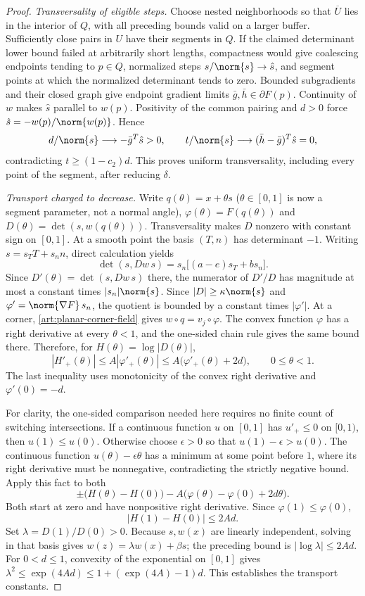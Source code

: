 \begin{proof}
\emph{Transversality of eligible steps.}
Choose nested neighborhoods so that $\overline U$ lies in the interior of
$Q$, with all preceding bounds valid on a larger buffer. Sufficiently close
pairs in $U$ have their segments in $Q$.
If the claimed determinant lower bound failed at arbitrarily short lengths,
compactness would give coalescing endpoints tending to $p\in Q$, normalized
steps $s/\norm{s}\to\hat s$, and segment points at which the normalized
determinant tends to zero. Bounded subgradients and their closed graph give
endpoint gradient limits $\bar g,\bar h\in\partial F(p)$. Continuity of $w$ makes
$\hat s$ parallel to $w(p)$. Positivity of the common pairing and $d>0$ force
$\hat s=-w(p)/\norm{w(p)}$. Hence
\[
 d/\norm{s}\longrightarrow-\bar g^T\hat s>0,
 \qquad t/\norm{s}\longrightarrow(\bar h-\bar g)^T\hat s=0,
\]
contradicting $t\ge(1-c_2)d$. This proves uniform transversality, including
every point of the segment, after reducing $\delta$.

\emph{Transport charged to decrease.}
Write $q(\theta)=x+\theta s$ ($\theta\in[0,1]$ is now a segment parameter, not a
normal angle),
$\varphi(\theta)=F(q(\theta))$ and
$D(\theta)=\det(s,w(q(\theta)))$.
Transversality makes $D$ nonzero with constant sign on $[0,1]$.
At a smooth point the basis $(T,n)$ has determinant $-1$. Writing
$s=s_TT+s_n n$, direct calculation yields
\begin{equation}\label{art:planar-determinant-derivative}
 \det(s,Dw\,s)=s_n\bigl[(a-e)s_T+b s_n\bigr].
\end{equation}
Since $D'(\theta)=\det(s,Dw\,s)$ there, the numerator of $D'/D$ has magnitude
at most a constant times $|s_n|\norm{s}$.
Since $|D|\ge\kappa\norm{s}$ and
$\varphi'=\norm{\nabla F}\,s_n$, the quotient is bounded by a constant
times $|\varphi'|$. At a corner, \eqref{art:planar-corner-field} gives
$w\circ q=v_j\circ\varphi$. The convex function $\varphi$ has a right
derivative at every $\theta<1$, and the one-sided chain rule gives the same
bound there. Therefore, for $H(\theta)=\log|D(\theta)|$,
\[
 |H'_+(\theta)|\le A|\varphi'_+(\theta)|
 \le A\bigl(\varphi'_+(\theta)+2d\bigr),
 \qquad 0\le\theta<1.
\]
The last inequality uses monotonicity of the convex right derivative and
${\varphi'(0)=-d}$.

For clarity, the one-sided comparison needed here requires no finite count
of switching intersections. If a continuous function $u$ on $[0,1]$ has
$u'_+\le0$ on $[0,1)$, then $u(1)\le u(0)$. Otherwise choose $\epsilon>0$
so that $u(1)-\epsilon>u(0)$. The continuous function
$u(\theta)-\epsilon\theta$ has a minimum at some point before $1$, where its right
derivative must be nonnegative, contradicting the strictly negative bound.
Apply this fact to both
\[
 \pm\bigl(H(\theta)-H(0)\bigr)
       -A\bigl(\varphi(\theta)-\varphi(0)+2d\theta\bigr).
\]
Both start at zero and have nonpositive right derivative. Since
$\varphi(1)\le\varphi(0)$,
\[
 |H(1)-H(0)|\le2Ad.
\]
Set $\lambda=D(1)/D(0)>0$. Because $s,w(x)$ are linearly independent,
solving in that basis gives $w(z)=\lambda w(x)+\beta s$; the preceding
bound is $|\log\lambda|\le2Ad$. For $0<d\le1$, convexity of the exponential
on $[0,1]$ gives
$\lambda^2\le\exp(4Ad)\le1+(\exp(4A)-1)d$.
This establishes the transport constants.


\end{proof}
